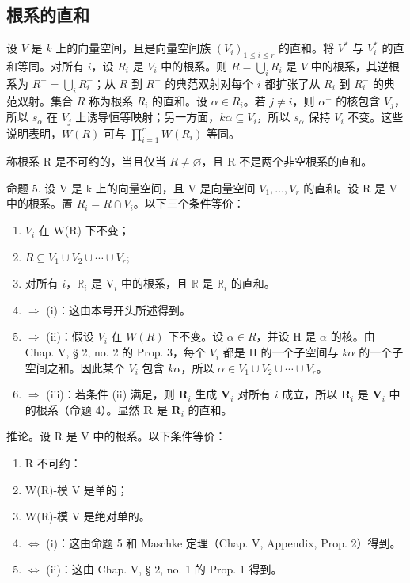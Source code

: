 \subsection{根系的直和}

设 \(V\) 是 \(k\) 上的向量空间，且是向量空间族 \((V_i)_{1 \leqslant i \leqslant r}\) 的直和。将 \(V^*\) 与 \(V_i^*\) 的直和等同。对所有 \(i\)，设 \(R_i\) 是 \(V_i\) 中的根系。则 \(R = \bigcup_i R_i\) 是 \(V\) 中的根系，其逆根系为 \(R^- = \bigcup_i R_i^-\)；从 \(R\) 到 \(R^-\) 的典范双射对每个 \(i\) 都扩张了从 \(R_i\) 到 \(R_i^-\) 的典范双射。集合 \(R\) 称为根系 \(R_i\) 的直和。设 \(\alpha \in R_i\)。若 \(j \neq i\)，则 \(\alpha^-\) 的核包含 \(V_j\)，所以 \(s_\alpha\) 在 \(V_j\) 上诱导恒等映射；另一方面，\(k\alpha \subseteq V_i\)，所以 \(s_\alpha\) 保持 \(V_i\) 不变。这些说明表明，\(W(R)\) 可与 \(\prod_{i=1}^{r} W(R_i)\) 等同。

称根系 R 是不可约的，当且仅当 \(R \neq \varnothing\)，且 R 不是两个非空根系的直和。

命题 5. 设 V 是 k 上的向量空间，且 V 是向量空间 \(V_{1}, \ldots, V_{r}\) 的直和。设 R 是 V 中的根系。置 \(R_{i} = R \cap V_{i}\)。以下三个条件等价：

\begin{enumerate}
\def\labelenumi{(\roman{enumi})}
\item
  \(V_{i}\) 在 W(R) 下不变；
\item
  \(R \subseteq V_{1} \cup V_{2} \cup \cdots \cup V_{r};\)
\item
  对所有 \(i\)，\(\mathbb{R}_i\) 是 \(\mathrm{V}_i\) 中的根系，且 \(\mathbb{R}\) 是 \(\mathbb{R}_i\) 的直和。
\item
  \(\Longrightarrow\) (i)：这由本号开头所述得到。
\item
  \(\Longrightarrow\) (ii)：假设 \(V_{i}\) 在 \(W(R)\) 下不变。设 \(\alpha \in R\)，并设 H 是 \(\alpha\) 的核。由 Chap. V, § 2, no. 2 的 Prop. 3，每个 \(V_{i}\) 都是 H 的一个子空间与 \(k\alpha\) 的一个子空间之和。因此某个 \(V_{i}\) 包含 \(k\alpha\)，所以 \(\alpha \in V_{1} \cup V_{2} \cup \cdots \cup V_{r}\)。
\item
  \(\Longrightarrow\) (iii)：若条件 (ii) 满足，则 \(\mathbf{R}_i\) 生成 \(\mathbf{V}_i\) 对所有 \(i\) 成立，所以 \(\mathbf{R}_i\) 是 \(\mathbf{V}_i\) 中的根系（命题 4）。显然 \(\mathbf{R}\) 是 \(\mathbf{R}_i\) 的直和。
\end{enumerate}

推论。设 R 是 V 中的根系。以下条件等价：

\begin{enumerate}
\def\labelenumi{(\roman{enumi})}
\item
  R 不可约：
\item
  W(R)-模 V 是单的；
\item
  W(R)-模 V 是绝对单的。
\item
  \(\Longleftrightarrow\) (i)：这由命题 5 和 Maschke 定理（Chap. V, Appendix, Prop. 2）得到。
\item
  \(\Longleftrightarrow\) (ii)：这由 Chap. V, § 2, no. 1 的 Prop. 1 得到。
\end{enumerate}

